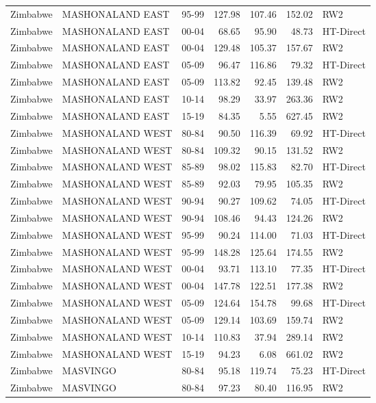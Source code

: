 \begin{longtable}{lllrrrl}
  Zimbabwe & MASHONALAND EAST & 95-99 & 127.98 & 107.46 & 152.02 & RW2 \\ 
  Zimbabwe & MASHONALAND EAST & 00-04 & 68.65 & 95.90 & 48.73 & HT-Direct \\ 
  Zimbabwe & MASHONALAND EAST & 00-04 & 129.48 & 105.37 & 157.67 & RW2 \\ 
  Zimbabwe & MASHONALAND EAST & 05-09 & 96.47 & 116.86 & 79.32 & HT-Direct \\ 
  Zimbabwe & MASHONALAND EAST & 05-09 & 113.82 & 92.45 & 139.48 & RW2 \\ 
  Zimbabwe & MASHONALAND EAST & 10-14 & 98.29 & 33.97 & 263.36 & RW2 \\ 
  Zimbabwe & MASHONALAND EAST & 15-19 & 84.35 & 5.55 & 627.45 & RW2 \\ 
  Zimbabwe & MASHONALAND WEST & 80-84 & 90.50 & 116.39 & 69.92 & HT-Direct \\ 
  Zimbabwe & MASHONALAND WEST & 80-84 & 109.32 & 90.15 & 131.52 & RW2 \\ 
  Zimbabwe & MASHONALAND WEST & 85-89 & 98.02 & 115.83 & 82.70 & HT-Direct \\ 
  Zimbabwe & MASHONALAND WEST & 85-89 & 92.03 & 79.95 & 105.35 & RW2 \\ 
  Zimbabwe & MASHONALAND WEST & 90-94 & 90.27 & 109.62 & 74.05 & HT-Direct \\ 
  Zimbabwe & MASHONALAND WEST & 90-94 & 108.46 & 94.43 & 124.26 & RW2 \\ 
  Zimbabwe & MASHONALAND WEST & 95-99 & 90.24 & 114.00 & 71.03 & HT-Direct \\ 
  Zimbabwe & MASHONALAND WEST & 95-99 & 148.28 & 125.64 & 174.55 & RW2 \\ 
  Zimbabwe & MASHONALAND WEST & 00-04 & 93.71 & 113.10 & 77.35 & HT-Direct \\ 
  Zimbabwe & MASHONALAND WEST & 00-04 & 147.78 & 122.51 & 177.38 & RW2 \\ 
  Zimbabwe & MASHONALAND WEST & 05-09 & 124.64 & 154.78 & 99.68 & HT-Direct \\ 
  Zimbabwe & MASHONALAND WEST & 05-09 & 129.14 & 103.69 & 159.74 & RW2 \\ 
  Zimbabwe & MASHONALAND WEST & 10-14 & 110.83 & 37.94 & 289.14 & RW2 \\ 
  Zimbabwe & MASHONALAND WEST & 15-19 & 94.23 & 6.08 & 661.02 & RW2 \\ 
  Zimbabwe & MASVINGO & 80-84 & 95.18 & 119.74 & 75.23 & HT-Direct \\ 
  Zimbabwe & MASVINGO & 80-84 & 97.23 & 80.40 & 116.95 & RW2 \\ 

\end{longtable}
